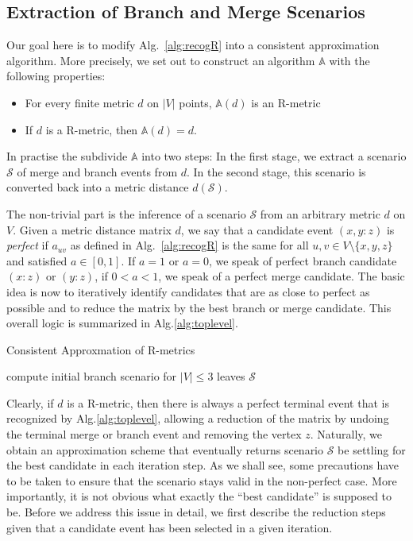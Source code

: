 \documentclass{article}
\begin{document}
\subsection{Extraction of Branch and Merge Scenarios} 

Our goal here is to modify Alg.~\ref{alg:recogR} into a consistent
approximation algorithm. More precisely, we set out to construct an
algorithm $\mathbb{A}$ with the following properties:
\begin{itemize} 
  \item For every finite metric $d$ on $|V|$ points, $\mathbb{A}(d)$ 
    is an R-metric
  \item If $d$ is a R-metric, then $\mathbb{A}(d)=d$.
\end{itemize} 
In practise the subdivide $\mathbb{A}$ into two steps: In the first stage,
we extract a scenario $\mathcal{S}$ of merge and branch events from $d$. In
the second stage, this scenario is converted back into a metric distance
$d(\mathcal{S})$.

The non-trivial part is the inference of a scenario $\mathcal{S}$ from an
arbitrary metric $d$ on $V$. Given a metric distance matrix $d$, we say
that a candidate event $(x,y:z)$ is \emph{perfect} if $a_{uv}$ as defined
in Alg.~\ref{alg:recogR} is the same for all $u,v\in V\setminus\{x,y,z\}$
and satisfied $a\in [0,1]$. If $a=1$ or $a=0$, we speak of perfect branch
candidate $(x:z)$ or $(y:z)$, if $0<a<1$, we speak of a perfect merge
candidate. The basic idea is now to iteratively identify candidates that
are as close to perfect as possible and to reduce the matrix by the best
branch or merge candidate. This overall logic is summarized in
Alg.\ref{alg:toplevel}.

\begin{algorithm}[H]
\caption{Consistent Approxmation of R-metrics}
\label{alg:toplevel}
\SetAlgoLined
{}
compute initial branch scenario for $|V|\le 3$ leaves\;
\Return $\mathcal{S}$ 
\end{algorithm} 

Clearly, if $d$ is a R-metric, then there is always a perfect terminal
event that is recognized by Alg.\ref{alg:toplevel}, allowing a reduction of
the matrix by undoing the terminal merge or branch event and removing the
vertex $z$. Naturally, we obtain an approximation scheme that eventually
returns scenario $\mathcal{S}$ be settling for the best candidate in each
iteration step. As we shall see, some precautions have to be taken to
ensure that the scenario stays valid in the non-perfect case. More
importantly, it is not obvious what exactly the ``best candidate'' is
supposed to be. Before we address this issue in detail, we first describe
the reduction steps given that a candidate event has been selected in a
given iteration.
\end{document}
